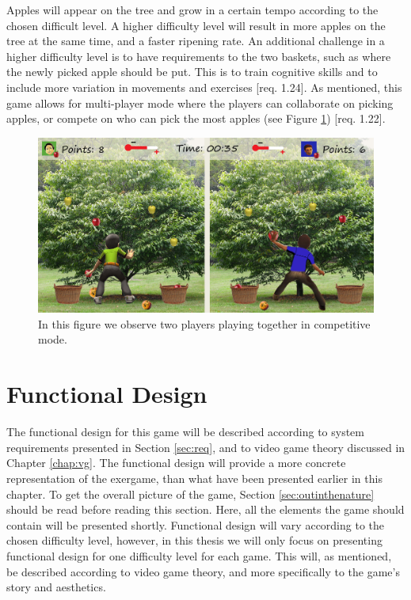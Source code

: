 Apples will appear on the tree and grow in a certain tempo according to the chosen difficult level. A higher difficulty level will result in more apples on the tree at the same time, and a faster ripening rate. An additional challenge in a higher difficulty level is to have requirements to the two baskets, such as where the newly picked apple should be put. This is to train cognitive skills and to include more variation in movements and exercises [req. 1.24]. As mentioned, this game allows for multi-player mode where the players can collaborate on picking apples, or compete on who can pick the most apples (see Figure \ref{fig:appleMultiplayer}) [req. 1.22]. 

\begin{figure} [H]
\centering
\includegraphics[scale=0.07]{gameapple2playerEngelsk.jpg}
\caption[Picking apples - multi-player]{In this figure we observe two players playing together in competitive mode.}
\label{fig:appleMultiplayer}
\end{figure}

\section{Functional Design}
\label{sec:functionaldesign}

The functional design for this game will be described according to system requirements presented in Section \ref{sec:req}, and to video game theory discussed in Chapter \ref{chap:vg}. The functional design will provide a more concrete representation of the exergame, than what have been presented earlier in this chapter. To get the overall picture of the game, Section \ref{sec:outinthenature} should be read before reading this section. Here, all the elements the game should contain will be presented shortly. Functional design will vary according to the chosen difficulty level, however, in this thesis we will only focus on presenting functional design for one difficulty level for each game. This will, as mentioned, be described according to video game theory, and more specifically to the game's story and aesthetics.  

